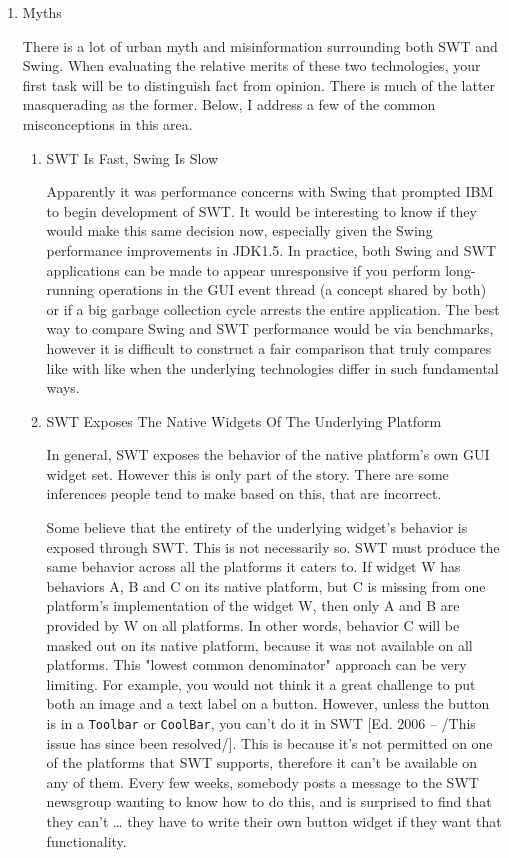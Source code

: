\documentclass{article}
\begin{document}
\begin{enumerate}
\item Myths
\label{sec:orgheadline297}

There is a lot of urban myth and misinformation surrounding both SWT and
Swing. When evaluating the relative merits of these two technologies,
your first task will be to distinguish fact from opinion. There is much
of the latter masquerading as the former. Below, I address a few of the
common misconceptions in this area.

\begin{enumerate}
\item SWT Is Fast, Swing Is Slow
\label{sec:orgheadline292}

Apparently it was performance concerns with Swing that prompted IBM to
begin development of SWT. It would be interesting to know if they would
make this same decision now, especially given the Swing performance
improvements in JDK1.5. In practice, both Swing and SWT applications can
be made to appear unresponsive if you perform long-running operations in
the GUI event thread (a concept shared by both) or if a big garbage
collection cycle arrests the entire application. The best way to compare
Swing and SWT performance would be via benchmarks, however it is
difficult to construct a fair comparison that truly compares like with
like when the underlying technologies differ in such fundamental ways.

\item SWT Exposes The Native Widgets Of The Underlying Platform
\label{sec:orgheadline293}

In general, SWT exposes the behavior of the native platform's own GUI
widget set. However this is only part of the story. There are some
inferences people tend to make based on this, that are incorrect.

Some believe that the entirety of the underlying widget's behavior is
exposed through SWT. This is not necessarily so. SWT must produce the
same behavior across all the platforms it caters to. If widget W has
behaviors A, B and C on its native platform, but C is missing from one
platform's implementation of the widget W, then only A and B are
provided by W on all platforms. In other words, behavior C will be
masked out on its native platform, because it was not available on all
platforms. This "lowest common denominator" approach can be very
limiting. For example, you would not think it a great challenge to put
both an image and a text label on a button. However, unless the button
is in a \texttt{Toolbar} or \texttt{CoolBar}, you can't do it in SWT [Ed. 2006 --
/This issue has since been resolved/]. This is because it's not
permitted on one of the platforms that SWT supports, therefore it can't
be available on any of them. Every few weeks, somebody posts a message
to the SWT newsgroup wanting to know how to do this, and is surprised to
find that they can't \ldots{} they have to write their own button widget if
they want that functionality.


\end{enumerate}
\end{enumerate}
\end{document}
